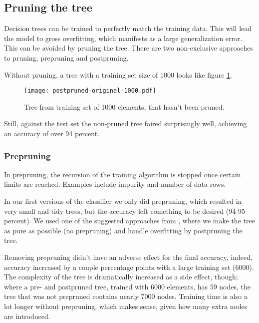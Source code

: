 \documentclass[a4paper,10pt]{article}
\begin{document}
\subsection{Pruning the tree}

Decision trees can be trained to perfectly match the training
data\cite[p. 182]{alpaydin2004}.  This will lead the model to
gross overfitting, which manifests as a large generalization error.
This can be avoided by pruning the tree.  There are two non-exclusive
approaches to pruning, prepruning and postpruning.

Without pruning, a tree with a training set size of 1000 looks like
figure \ref{fig:no-pruning-1000}.

\begin{figure}[h]
  \centering
  \begin{minipage}[c]{1.0\textwidth}
    \centering
\texttt{[image: postpruned-original-1000.pdf]}
  \end{minipage}
  \caption{Tree from training set of 1000 elements, that hasn't been
    pruned.}
  \label{fig:no-pruning-1000}
\end{figure}

Still, against the test set the non-pruned tree faired surprisingly
well, achieving an accuracy of over 94 percent.

\subsubsection{Prepruning}

In prepruning, the recursion of the training algorithm is stopped once
certain limits are reached.  Examples include impurity and number of
data rows.

In our first versions of the classifier we only did prepruning, which
resulted in very small and tidy trees, but the accuracy left comething
to be desired (94-95 percent).  We used one of the suggested
approaches from \cite{alpaydin2004}, where we make the tree as pure as
possible (no prepruning) and handle overfitting by postpruning the tree.

Removing prepruning didn't have an adverse effect for the final
accuracy, indeed, accuracy increased by a couple percentage points with
a large training set (6000).  The complexity of the tree is dramatically
increased as a side effect, though; where a pre- and postpruned tree,
trained with 6000 elements, has 59 nodes, the tree that was not
prepruned contains nearly 7000 nodes.  Training time is also a lot
longer without prepruning, which makes sense, given how many extra nodes
are introduced.
\end{document}
